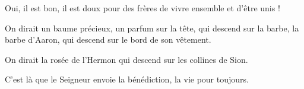 \item Oui, il est bon, il est doux pour des frères de vivre ensemble et d'être unis !

\item On dirait un baume précieux, un parfum sur la tête, qui descend sur la barbe, la barbe d'Aaron, qui descend sur le bord de son vêtement.

\item On dirait la rosée de l'Hermon qui descend sur les collines de Sion. 

\item C'est là que le Seigneur envoie la bénédiction, la vie pour toujours.